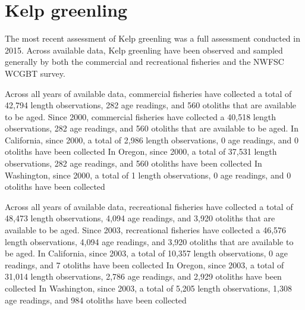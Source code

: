 \documentclass[11pt,
  english,
  letterpaper,
]{article}
\begin{document}

\hypertarget{kelp-greenling}{%
\section{Kelp greenling}\label{kelp-greenling}}

\leavevmode\tagmcend\tagstructend


The most recent assessment of Kelp greenling was a full assessment conducted in 2015. Across available data, Kelp greenling have been observed and sampled generally by both the commercial and recreational fisheries and the NWFSC WCGBT survey.

\leavevmode\tagmcend\tagstructend\par


Across all years of available data, commercial fisheries have collected a total of 42,794 length observations, 282 age readings, and 560 otoliths that are available to be aged. Since 2000, commercial fisheries have collected a 40,518 length observations, 282 age readings, and 560 otoliths that are available to be aged. In California, since 2000, a total of 2,986 length observations, 0 age readings, and 0 otoliths have been collected In Oregon, since 2000, a total of 37,531 length observations, 282 age readings, and 560 otoliths have been collected In Washington, since 2000, a total of 1 length observations, 0 age readings, and 0 otoliths have been collected

\leavevmode\tagmcend\tagstructend\par


Across all years of available data, recreational fisheries have collected a total of 48,473 length observations, 4,094 age readings, and 3,920 otoliths that are available to be aged. Since 2003, recreational fisheries have collected a 46,576 length observations, 4,094 age readings, and 3,920 otoliths that are available to be aged. In California, since 2003, a total of 10,357 length observations, 0 age readings, and 7 otoliths have been collected In Oregon, since 2003, a total of 31,014 length observations, 2,786 age readings, and 2,929 otoliths have been collected In Washington, since 2003, a total of 5,205 length observations, 1,308 age readings, and 984 otoliths have been collected
\end{document}
